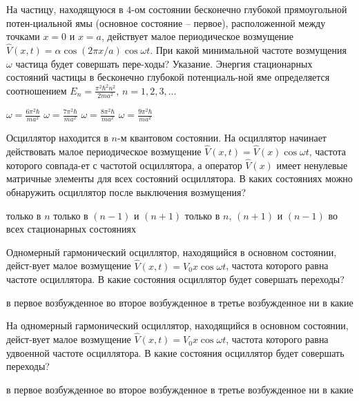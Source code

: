 \documentclass[11pt,a4paper]{exam}
\begin{document}
\begin{questions}
\question На частицу, находящуюся в $4$-ом состоянии бесконечно глубокой прямоугольной потен-циальной ямы (основное состояние – первое), расположенной между точками $x = 0$ и $x = a$, действует малое периодическое возмущение $\hat V(x,t) = \alpha \cos \left( {2\pi x/a} \right)\cos \omega t$. При какой минимальной частоте возмущения $\omega $ частица будет совершать пере-ходы? Указание. Энергия стационарных состояний частицы в бесконечно глубокой потенциаль-ной яме определяется соотношением ${E_n} = \frac{{{\pi ^2}{\hbar ^2}{n^2}}}{{2m{a^2}}}$, $n = 1,2,3,...$
\begin{choices}
\choice $\omega  = \frac{{6{\pi ^2}\hbar }}{{m{a^2}}}$     
\choice $\omega  = \frac{{7{\pi ^2}\hbar }}{{m{a^2}}}$     
\choice $\omega  = \frac{{8{\pi ^2}\hbar }}{{m{a^2}}}$     
\choice $\omega  = \frac{{9{\pi ^2}\hbar }}{{m{a^2}}}$ 
\end{choices}

\question Осциллятор находится в $n$-м квантовом состоянии. На осциллятор начинает действовать малое периодическое возмущение $\hat V(x,t) = \hat V(x)\cos \omega t$, частота которого совпада-ет с частотой осциллятора, а оператор $\hat V(x)$ имеет ненулевые матричные элементы для всех состояний осциллятора. В каких состояниях можно обнаружить осциллятор после выключения возмущения? 
\begin{choices}
\choice только в $n$            
\choice только в $(n - 1)$ и $(n + 1)$
\choice только в $n$, $(n + 1)$ и $(n - 1)$ 
\choice во всех стационарных состояниях
\end{choices}

\question Одномерный гармонический осциллятор, находящийся в основном состоянии, дейст-вует малое возмущение $\hat V(x,t) = {V_0}x\cos \omega t$, частота которого равна частоте осциллятора. В какие состояния осциллятор будет совершать переходы? 
\begin{choices}
\choice в первое возбужденное      
\choice во второе возбужденное
\choice в третье возбужденное      
\choice ни в какие
\end{choices}

\question На одномерный гармонический осциллятор, находящийся в основном состоянии, дейст-вует малое возмущение $\hat V(x,t) = {V_0}x\cos \omega t$, частота которого равна удвоенной частоте осциллятора. В какие состояния осциллятор будет совершать переходы? 
\begin{choices}
\choice в первое возбужденное      
\choice во второе возбужденное
\choice в третье возбужденное      
\choice ни в какие
\end{choices}


\end{questions}
\end{document}

